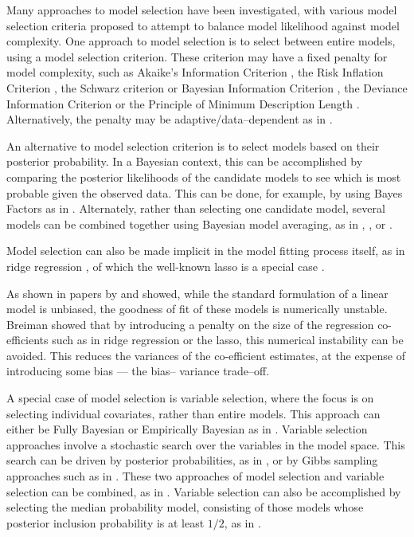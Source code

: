 Many approaches to model selection have been investigated, with various model selection criteria proposed to
attempt to balance model likelihood against model complexity. One approach to model selection is to select
between entire models, using a model selection criterion. These criterion may have a fixed penalty for model
complexity, such as Akaike's Information Criterion \citep{Akaike1974}, the Risk Inflation Criterion
\citep{Foster1994}, the Schwarz criterion or Bayesian Information Criterion \citep{Schwarz1978}, the Deviance
Information Criterion \citep{Spiegelhalter2016} or the Principle of Minimum Description Length
\citep{Hansen2001}. Alternatively, the penalty may be adaptive/data--dependent as in \citep{George2000}.

An alternative to model selection criterion is to select models based on their posterior probability. In a
Bayesian context, this can be accomplished by comparing the posterior likelihoods of the candidate models to
see which is most probable given the observed data. This can be done, for example, by using Bayes Factors as
in \citep{Kass1993}. Alternately, rather than selecting one candidate model, several models can be combined together using Bayesian model  averaging, as in \citep{Hoeting1999}, \citep{Raftery1997}, \citep{Fernandez2001} or \citep{Papaspiliopoulos2016}.

Model selection can also be made implicit in the model fitting process itself, as in ridge regression
\citep{Casella1980}, of which the well-known lasso is a special case \citep{Tibshirani1996}.

As shown in
papers by \citep{Breiman1996} and \citep{Efron2013} showed, while  the standard formulation of a linear model
is unbiased, the goodness of fit of these models is numerically  unstable. Breiman showed that by introducing
a penalty on the size of the regression co- efficients such as  in ridge regression or the lasso, this numerical
instability can be avoided. This reduces the variances of the co-efficient estimates, at the expense of
introducing some bias --- the bias-- variance trade--off.

A special case of model selection is variable selection, where the focus is on selecting individual
covariates, rather than entire models. This approach can either be Fully Bayesian or Empirically Bayesian as
in \citep{Cui2008}. Variable selection approaches involve a stochastic search over the variables in the model
space. This search can be driven by posterior probabilities, as in \citep{Casella2006}, or by Gibbs sampling
approaches such as in \citep{George1993}. These two approaches of model selection and variable selection can
be combined, as in \citep{Geweke1996}. Variable selection can also be accomplished by selecting the median
probability model, consisting of those models whose posterior inclusion probability is at least $1/2$, as in
\citep{Barbieri2004}.

